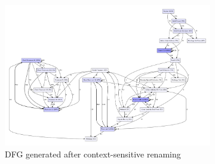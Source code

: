 \documentclass[12pt]{report}
\begin{document}
\begin{figure}[h]
    \centering
    \begin{subfigure}[b]{0.4\textwidth}
	\centering
	\includegraphics[width=\textwidth]{figures/q1_c_dfg_renaming.pdf}
	\caption{DFG generated after context-sensitive renaming}
	\label{fig:subfigures-q1_c_dfg_renaming-pdf}
    \end{subfigure}
    \hfill
    \begin{subfigure}[b]{0.4\textwidth}
	\centering

\end{subfigure}
\end{figure}
\end{document}
